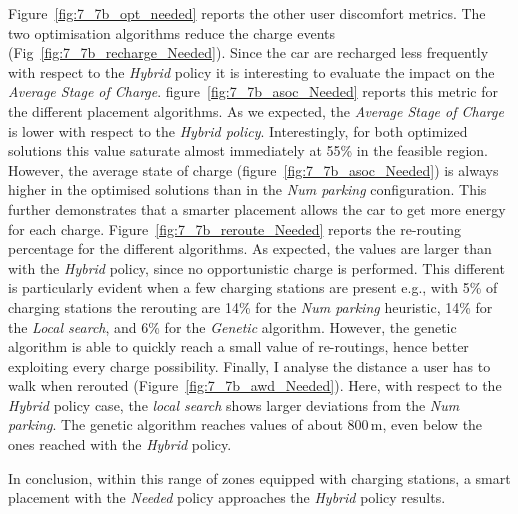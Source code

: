  
Figure~\ref{fig:7_7b_opt_needed} reports the other user discomfort metrics. The two optimisation algorithms reduce the charge events (Fig~\ref{fig:7_7b_recharge_Needed}).
Since the car are recharged less frequently with respect to the \textit{Hybrid} policy it is interesting to evaluate the impact on the \textit{Average Stage of Charge}. figure~\ref{fig:7_7b_asoc_Needed} reports this metric for the different placement algorithms.  As we expected, the \textit{Average Stage of Charge} is lower with respect to the \textit{Hybrid policy}. Interestingly, for both optimized solutions this value saturate almost immediately at 55\% in the feasible region.
However,  the average state of charge (figure~\ref{fig:7_7b_asoc_Needed}) is always higher in the optimised solutions than in the \textit{Num parking} configuration. This further demonstrates that a smarter placement allows the car to get more energy for each charge.
Figure~\ref{fig:7_7b_reroute_Needed} reports the re-routing percentage for the different algorithms. As expected, the values are larger than with the \textit{Hybrid} policy, since no opportunistic charge is performed. 
This different is particularly evident when a few charging stations are present e.g., with 5\% of charging stations the rerouting are 14\% for the \textit{Num parking} heuristic, 14\% for the \textit{Local search}, and 6\% for the \textit{Genetic} algorithm. 
However, the genetic algorithm is able to quickly reach a small value of re-routings, hence better exploiting every charge possibility. 
Finally, I analyse the distance a user has to walk when rerouted (Figure~\ref{fig:7_7b_awd_Needed}). Here, with respect to the \textit{Hybrid} policy case, the \textit{local search} shows larger deviations from the \textit{Num parking}. The genetic algorithm reaches values of about 800\,m, even below the ones reached with the \textit{Hybrid} policy.

In conclusion, within this range of zones equipped with charging stations, a smart placement with the \textit{Needed} policy approaches the \textit{Hybrid} policy results.  



 
 
 
 


